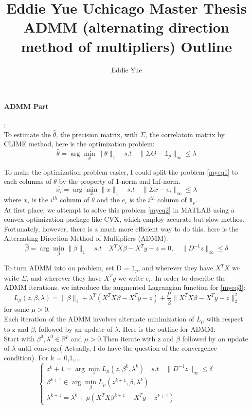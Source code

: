 \documentclass[a4paper,11pt]{article}
\author{Eddie Yue}
\title{Eddie Yue Uchicago Master Thesis \\
         \vspace{3 mm} \large ADMM (alternating direction method of multipliers) Outline}
\begin{document}
 
	\paragraph{ADMM Part}: \\
	To estimate the $\hat{\theta}$, the precision matrix, with $\Sigma$, the correlatoin matrix by CLIME method, here is the optimization problem:
	\[
	\hat{\theta} = \arg\!\min_\theta \|\theta\|_1
	\quad s.t \quad \|\Sigma\Theta - \mathds{1}_p\|_\infty \leq \lambda
	\tag{1}\label{myeq1}
	\] 
	
	To make the optimization problem easier, I could split the problem \eqref{myeq1} to each colunms of $\theta$ by the property of 1-norm and Inf-norm.
	\[ \hat{x_i} = \arg\!\min_x \|x\|_1
	\quad s.t \quad \|\Sigma{x} - e_i\|_\infty \leq \lambda
	\tag{2}\label{myeq2} \]
	where $x_i$ is the $i^{th}$ colunm of $\theta$ and the $e_i$ is the $i^{th}$ column of $\mathds{1}_p $.\\
	At first place, we attempt to solve this problem \eqref{myeq2} in MATLAB using a convex optimization package like CVX, which employ accurate but slow methos. Fortunately, however, there is a much more efficient way to do this, here is the Alternating Direction Method of Multipliers (ADMM):
	\[
	\hat{\beta} = \arg\!\min_\beta \|\beta\|_1
	\quad s.t \quad X^TX\beta - X^Ty - z = 0, \quad \|D^{-1}z\|_\infty \leq \delta
	\tag{3}\label{myeq3}
	\] 
	
	To turn ADMM into ou problem, set D = $\mathds{1}_p$, and wherever they have $X^TX$ we write $\Sigma$, and wherever they have $X^Ty$ we write $e_i$. In order to describe the ADMM iterations, we introduce the augmented Lagrangian function for \eqref{myeq3}:
	\[
	L_\mu(z,\beta,\lambda) = \|\beta\|_1 + \lambda^T(X^TX\beta-X^Ty- z) + \frac{\mu}{2}\|X^TX\beta-X^Ty- z\|_{2}^2
	\tag{4}\label{myeq4}
	\]
	for some $\mu > 0$. \\
	
	Each iteration of the ADMM involves alternate minimization of $L_\mu$ with respect to z and $\beta$, followed by an update of $\lambda$. Here is the outline for ADMM:\\
	
	Start with $\beta^0 , \lambda^0 \in \mathbb{R}^p$ and $ \mu > 0$.Then iterate with z and $\beta$ followed by an update of $\lambda$ until converge( Actually, I do have the question of the convergence condition). For k = 0,1,...
	\[\left\{
	\begin{array}{lr}
	z^k+1 = \arg\!\min_z L_\mu(z,\beta^k,\lambda^k) \quad s.t \quad \|D^{-1}z\|_\infty \leq	\delta\\
	\beta^{k+1} \in \arg\!\min_\beta L_\mu(z^{k+1},\beta,\lambda^k)\\
	\lambda^{k+1} = \lambda^k +\mu(X^TX\beta^{k+1}-X^Ty-z^{k+1})
	\end{array}
	\right.
	\tag{5}\label{myeq5}
	\]
	
\end{document}
